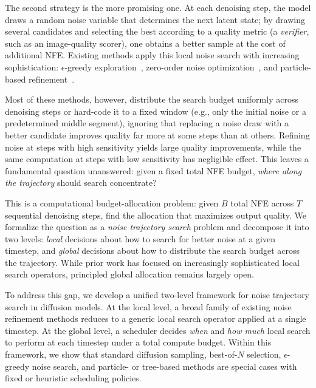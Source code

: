 The second strategy is the more promising one.
At each denoising step, the model draws a random noise variable that
determines the next latent state; by drawing several candidates and
selecting the best according to a quality metric (a \emph{verifier},
such as an image-quality scorer),
one obtains a better sample at the cost of additional NFE.
Existing methods apply this local noise search with increasing
sophistication: $\epsilon$-greedy
exploration~\citep{ramesh2025nts}, zero-order noise
optimization~\citep{tang2024dno}, and particle-based
refinement~\citep{kim2025rbf}.

Most of these methods, however, distribute the search budget uniformly
across denoising steps or hard-code it to a fixed window (e.g., only
the initial noise or a predetermined middle segment), ignoring that
replacing a noise draw with a better candidate improves quality far more at
some steps than at others.
Refining noise at steps with high sensitivity yields large quality
improvements, while the same computation at steps with low sensitivity has
negligible effect.
This leaves a fundamental question unanswered: given a fixed total
NFE budget, \emph{where along the trajectory} should search
concentrate?

This is a computational budget-allocation problem: given $B$ total NFE
across $T$ sequential denoising steps, find the allocation that maximizes
output quality.
We formalize the question as a \emph{noise trajectory search} problem
and decompose it into two levels: \emph{local} decisions about how to
search for better noise at a given timestep, and \emph{global} decisions
about how to distribute the search budget across the trajectory.
While prior work has focused on increasingly sophisticated local search
operators, principled global allocation remains largely open.

To address this gap, we develop a unified two-level framework for noise
trajectory search in diffusion models.
At the local level, a broad family of existing noise refinement methods reduces
to a generic local search operator applied at a single timestep.
At the global level, a scheduler decides \emph{when} and \emph{how much} local
search to perform at each timestep under a total compute budget.
Within this framework, we show that standard diffusion sampling, best-of-$N$
selection, $\epsilon$-greedy noise search, and particle- or tree-based methods
are special cases with fixed or heuristic scheduling policies.

